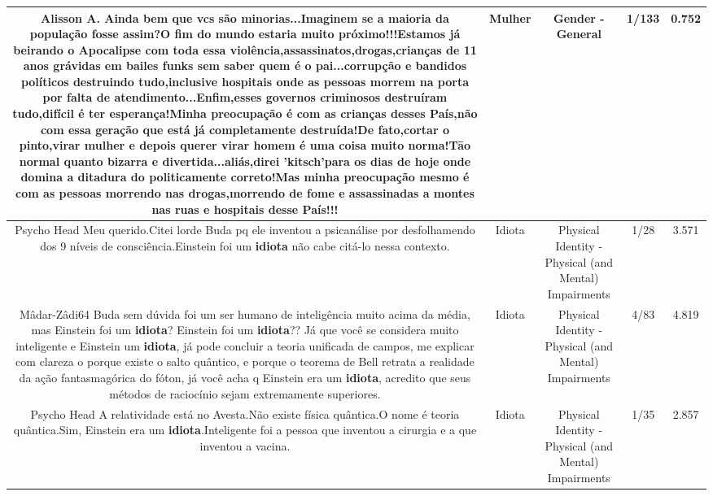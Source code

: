 \documentclass[11pt]{article}
\newlength\mylength
\begin{document}
\begin{center}
\begin{longtable}{|C{.65\mylength}|C{.30\mylength}|C{.12\mylength}|C{.12\mylength}|C{.12\mylength}|}
  \small Alisson A. Ainda bem que vcs são minorias...Imaginem se a maioria da população fosse assim?O fim do mundo estaria muito próximo!!!Estamos já beirando o Apocalipse com toda essa violência,assassinatos,drogas,crianças de 11 anos grávidas em bailes funks sem saber quem é o pai...corrupção e bandidos políticos destruindo tudo,inclusive hospitais onde as pessoas morrem na porta por falta de atendimento...Enfim,esses governos criminosos destruíram tudo,difícil é ter esperança!Minha preocupação é com as crianças desses País,não com essa geração que está já completamente destruída!De fato,cortar o pinto,virar \textbf{mulher} e depois querer virar homem é uma coisa muito norma!Tāo normal quanto bizarra e divertida...aliás,direi 'kitsch'para os dias de hoje onde domina a ditadura do politicamente correto!Mas minha preocupação mesmo é com as pessoas morrendo nas drogas,morrendo de fome e  assassinadas a montes nas ruas e hospitais desse País!!!\normalsize   & Mulher & Gender - General & 1/133 & 0.752 \\  \hline
  \small Psycho Head Meu querido.Citei lorde Buda pq ele inventou a psicanálise por desfolhamendo dos 9 níveis de consciência.Einstein foi um \textbf{idiota} não cabe citá-lo nessa contexto.\normalsize   & Idiota & Physical Identity - Physical (and Mental) Impairments & 1/28 & 3.571 \\  \hline
  \small Mâdar-Zâdi64  Buda sem dúvida foi um ser humano de inteligência muito acima da média, mas Einstein foi um \textbf{idiota}? Einstein foi um \textbf{idiota}?? Já que você se considera muito inteligente e Einstein um \textbf{idiota}, já pode concluir a teoria unificada de campos, me explicar com clareza o porque existe o salto quântico, e porque o teorema de Bell retrata a realidade da ação fantasmagórica do fóton, já você acha q  Einstein era um \textbf{idiota}, acredito que seus métodos de raciocínio sejam extremamente superiores.\normalsize   & Idiota & Physical Identity - Physical (and Mental) Impairments & 4/83 & 4.819 \\  \hline
  \small Psycho Head A relatividade está no Avesta.Não existe física quântica.O nome é teoria quântica.Sim, Einstein era um \textbf{idiota}.Inteligente foi a pessoa que inventou a cirurgia e a que inventou a vacina.\normalsize   & Idiota & Physical Identity - Physical (and Mental) Impairments & 1/35 & 2.857 \\  \hline

\end{longtable}
\end{center}
\end{document}
